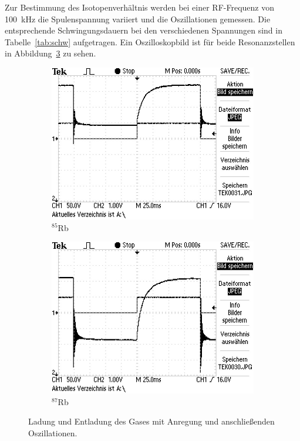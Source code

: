 Zur Bestimmung des Isotopenverhältnis werden bei einer RF-Frequenz von
\SI{100}{\kilo\hertz} die Spulenspannung variiert und die Oszillationen gemessen.
Die entsprechende Schwingungsdauern bei den verschiedenen Spannungen sind in
Tabelle~\ref{tab:schw} aufgetragen.
Ein Oszilloskopbild ist für beide Resonanzstellen in
Abbildung~\ref{fig:osz} zu sehen.
\begin{figure}[h]
	\centering
	\begin{subfigure}[c]{0.45\textwidth}
	\begin{center}
	\includegraphics[width=\textwidth]{./picture/Peak_1.JPG}
	\end{center}
	\caption{$^{85}$Rb}%
	\label{fig:}
	\end{subfigure}
	\begin{subfigure}[c]{0.45\textwidth}
	\begin{center}
	\includegraphics[width=\textwidth]{./picture/Peak_2.JPG}
	\end{center}
	\caption{$^{87}$Rb}%
	\label{fig:}
	\end{subfigure}
	\caption{Ladung und Entladung des Gases mit Anregung und anschließenden
  Oszillationen.}%
	\label{fig:osz}
\end{figure}
